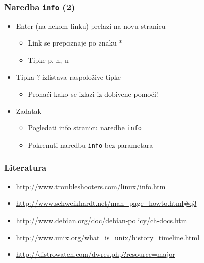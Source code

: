 \documentclass{beamer}
\newcommand{\shell}[1]{\texttt{#1}}
\begin{document}
\begin{frame}[t]
\frametitle{Naredba \shell{info} (2)}
\begin{itemize}
  \item Enter (na nekom linku) prelazi na novu stranicu
  \begin{itemize}
    \item Link se prepoznaje po znaku *
    \item Tipke p, n, u
  \end{itemize}
  \item Tipka ? izlistava raspoložive tipke
  \begin{itemize}
    \item  Pronaći kako se izlazi iz dobivene pomoći!
  \end{itemize}
  \item Zadatak
  \begin{itemize}
    \item Pogledati info stranicu naredbe \shell{info}
    \item Pokrenuti naredbu \shell{info} bez parametara
  \end{itemize}
\end{itemize}
\end{frame}

\begin{frame}[t]
\frametitle{Literatura}
\begin{itemize}
  \item \url{http://www.troubleshooters.com/linux/info.htm}
  \item \url{http://www.schweikhardt.net/man_page_howto.html#q3}
  \item \url{http://www.debian.org/doc/debian-policy/ch-docs.html}
  \item \url{http://www.unix.org/what_is_unix/history_timeline.html}
  \item \url{http://distrowatch.com/dwres.php?resource=major}
\end{itemize}
\end{frame}
\end{document}
